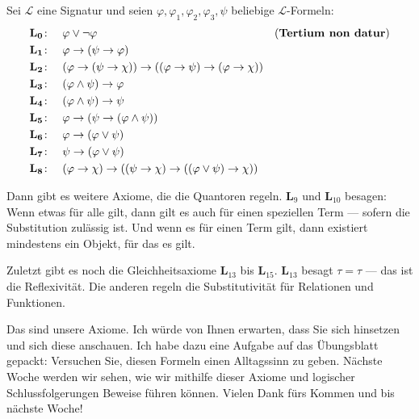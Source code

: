 \begin{math-stroke}
Sei $\mathcal{L}$ eine Signatur und seien $\varphi, \varphi_1, \varphi_2, \varphi_3, \psi$ beliebige $\mathcal{L}$-Formeln:
\begin{align}
    \mathbf{L_0}\colon &\quad \varphi \vee \neg \varphi && \text{(\textbf{Tertium non datur})} \nonumber \\
    \mathbf{L_1}\colon &\quad \varphi \rightarrow (\psi \rightarrow \varphi) \nonumber \\
    \mathbf{L_2}\colon &\quad (\varphi \rightarrow (\psi \rightarrow \chi)) \rightarrow ((\varphi \rightarrow \psi) \rightarrow (\varphi \rightarrow \chi)) \nonumber \\
    \mathbf{L_3}\colon &\quad (\varphi \wedge \psi) \rightarrow \varphi \nonumber \\
    \mathbf{L_4}\colon &\quad (\varphi \wedge \psi) \rightarrow \psi \nonumber \\
    \mathbf{L_5}\colon &\quad \varphi \rightarrow (\psi \rightarrow (\varphi \wedge \psi)) \nonumber \\
    \mathbf{L_6}\colon &\quad \varphi \rightarrow (\varphi \vee \psi) \nonumber \\
    \mathbf{L_7}\colon &\quad \psi \rightarrow (\varphi \vee \psi) \nonumber \\
    \mathbf{L_8}\colon &\quad (\varphi \rightarrow \chi) \rightarrow ((\psi \rightarrow \chi) \rightarrow ((\varphi \vee \psi) \rightarrow \chi)) \nonumber
\end{align}
\end{math-stroke}

\begin{spoken-clean}[01:25:27 - 01:26:27]
Dann gibt es weitere Axiome, die die Quantoren regeln. \textbf{L$_9$} und \textbf{L$_{10}$} besagen: Wenn etwas für alle gilt, dann gilt es auch für einen speziellen Term --- sofern die Substitution zulässig ist. Und wenn es für einen Term gilt, dann existiert mindestens ein Objekt, für das es gilt.

Zuletzt gibt es noch die Gleichheitsaxiome \textbf{L$_{13}$} bis \textbf{L$_{15}$}. \textbf{L$_{13}$} besagt $\tau = \tau$ --- das ist die Reflexivität. Die anderen regeln die Substitutivität für Relationen und Funktionen.

Das sind unsere Axiome. Ich würde von Ihnen erwarten, dass Sie sich hinsetzen und sich diese anschauen. Ich habe dazu eine Aufgabe auf das Übungsblatt gepackt: Versuchen Sie, diesen Formeln einen Alltagssinn zu geben. Nächste Woche werden wir sehen, wie wir mithilfe dieser Axiome und logischer Schlussfolgerungen Beweise führen können. Vielen Dank fürs Kommen und bis nächste Woche!
\end{spoken-clean}

